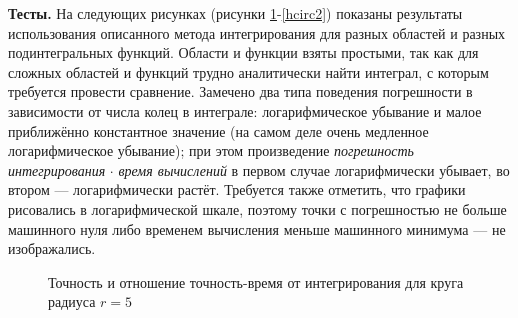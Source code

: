 \documentclass[a4paper, 12pt]{article}
\begin{document}
{\bf Тесты.} На следующих рисунках (рисунки \ref{circ5}-\ref{hcirc2}) показаны результаты использования описанного метода интегрирования для разных областей и разных подинтегральных функций.
Области и функции взяты простыми, так как для сложных областей и функций трудно  аналитически найти интеграл, с которым требуется провести сравнение.
Замечено два типа поведения погрешности в зависимости от числа колец в интеграле: логарифмическое убывание и малое приближённо константное значение (на самом деле очень медленное логарифмическое убывание); при этом произведение {\it погрешность интегрирования} $\cdot$ {\it время вычислений} в первом случае логарифмически убывает, во втором --- логарифмически растёт.
Требуется также отметить, что графики рисовались в логарифмической шкале, поэтому точки с погрешностью не больше машинного нуля либо временем вычисления меньше машинного минимума --- не изображались. 

\begin{figure}[h!]
    \noindent{}
    \caption{Точность и отношение точность-время от интегрирования для круга радиуса $r=5$}
    \label{circ5}
    \end{figure} 
  
\end{document}
